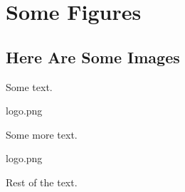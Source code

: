 \chapter{Some Figures}
\section{Here Are Some Images}

Some text.

    {logo.png}

Some more text.

    {logo.png}
    
Rest of the text.
    